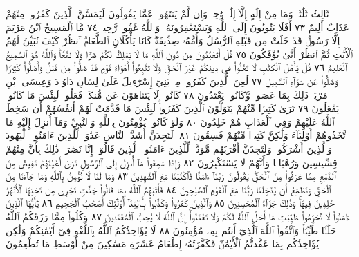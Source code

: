 ثَالِثُ ثَلَٰثَةࣲۘ وَمَا مِنْ إِلَٰهٍ إِلَّآ إِلَٰهࣱ وَٰحِدࣱۚ وَإِن لَّمْ يَنتَهُوا۟
عَمَّا يَقُولُونَ لَيَمَسَّنَّ ٱلَّذِينَ كَفَرُوا۟ مِنْهُمْ عَذَابٌ أَلِيمٌ ٧٣
أَفَلَا يَتُوبُونَ إِلَى ٱللَّهِ وَيَسْتَغْفِرُونَهُۥۚ وَٱللَّهُ غَفُورࣱ رَّحِيمࣱ ٧٤
مَّا ٱلْمَسِيحُ ٱبْنُ مَرْيَمَ إِلَّا رَسُولࣱ قَدْ خَلَتْ مِن قَبْلِهِ ٱلرُّسُلُ وَأُمُّهُۥ
صِدِّيقَةࣱۖ كَانَا يَأْكُلَانِ ٱلطَّعَامَۗ ٱنظُرْ كَيْفَ نُبَيِّنُ لَهُمُ ٱلْأٓيَٰتِ
ثُمَّ ٱنظُرْ أَنَّىٰ يُؤْفَكُونَ ٧٥ قُلْ أَتَعْبُدُونَ مِن دُونِ ٱللَّهِ مَا لَا
يَمْلِكُ لَكُمْ ضَرࣰّا وَلَا نَفْعࣰاۚ وَٱللَّهُ هُوَ ٱلسَّمِيعُ ٱلْعَلِيمُ ٧٦ قُلْ
يَٰٓأَهْلَ ٱلْكِتَٰبِ لَا تَغْلُوا۟ فِي دِينِكُمْ غَيْرَ ٱلْحَقِّ وَلَا تَتَّبِعُوٓا۟ أَهْوَآءَ
قَوْمࣲ قَدْ ضَلُّوا۟ مِن قَبْلُ وَأَضَلُّوا۟ كَثِيرࣰا وَضَلُّوا۟ عَن سَوَآءِ ٱلسَّبِيلِ ٧٧
لُعِنَ ٱلَّذِينَ كَفَرُوا۟ مِنۢ بَنِيٓ إِسْرَٰٓءِيلَ عَلَىٰ لِسَانِ
دَاوُۥدَ وَعِيسَى ٱبْنِ مَرْيَمَۚ ذَٰلِكَ بِمَا عَصَوا۟ وَّكَانُوا۟
يَعْتَدُونَ ٧٨ كَانُوا۟ لَا يَتَنَاهَوْنَ عَن مُّنكَرࣲ فَعَلُوهُۚ
لَبِئْسَ مَا كَانُوا۟ يَفْعَلُونَ ٧٩ تَرَىٰ كَثِيرࣰا مِّنْهُمْ
يَتَوَلَّوْنَ ٱلَّذِينَ كَفَرُوا۟ۚ لَبِئْسَ مَا قَدَّمَتْ لَهُمْ
أَنفُسُهُمْ أَن سَخِطَ ٱللَّهُ عَلَيْهِمْ وَفِي ٱلْعَذَابِ هُمْ
خَٰلِدُونَ ٨٠ وَلَوْ كَانُوا۟ يُؤْمِنُونَ بِٱللَّهِ وَٱلنَّبِيِّ وَمَآ
أُنزِلَ إِلَيْهِ مَا ٱتَّخَذُوهُمْ أَوْلِيَآءَ وَلَٰكِنَّ كَثِيرࣰا
مِّنْهُمْ فَٰسِقُونَ ٨١۞ لَتَجِدَنَّ أَشَدَّ ٱلنَّاسِ عَدَٰوَةࣰ
لِّلَّذِينَ ءَامَنُوا۟ ٱلْيَهُودَ وَٱلَّذِينَ أَشْرَكُوا۟ۖ وَلَتَجِدَنَّ
أَقْرَبَهُم مَّوَدَّةࣰ لِّلَّذِينَ ءَامَنُوا۟ ٱلَّذِينَ قَالُوٓا۟ إِنَّا نَصَٰرَىٰۚ
ذَٰلِكَ بِأَنَّ مِنْهُمْ قِسِّيسِينَ وَرُهْبَانࣰا وَأَنَّهُمْ
لَا يَسْتَكْبِرُونَ ٨٢ وَإِذَا سَمِعُوا۟ مَآ أُنزِلَ إِلَى
ٱلرَّسُولِ تَرَىٰٓ أَعْيُنَهُمْ تَفِيضُ مِنَ ٱلدَّمْعِ مِمَّا عَرَفُوا۟
مِنَ ٱلْحَقِّۖ يَقُولُونَ رَبَّنَآ ءَامَنَّا فَٱكْتُبْنَا مَعَ ٱلشَّٰهِدِينَ ٨٣
وَمَا لَنَا لَا نُؤْمِنُ بِٱللَّهِ وَمَا جَآءَنَا مِنَ ٱلْحَقِّ وَنَطْمَعُ أَن يُدْخِلَنَا
رَبُّنَا مَعَ ٱلْقَوْمِ ٱلصَّٰلِحِينَ ٨٤ فَأَثَٰبَهُمُ ٱللَّهُ بِمَا قَالُوا۟ جَنَّٰتࣲ
تَجْرِي مِن تَحْتِهَا ٱلْأَنْهَٰرُ خَٰلِدِينَ فِيهَاۚ وَذَٰلِكَ جَزَآءُ
ٱلْمُحْسِنِينَ ٨٥ وَٱلَّذِينَ كَفَرُوا۟ وَكَذَّبُوا۟ بِـَٔايَٰتِنَآ أُو۟لَٰٓئِكَ
أَصْحَٰبُ ٱلْجَحِيمِ ٨٦ يَٰٓأَيُّهَا ٱلَّذِينَ ءَامَنُوا۟ لَا تُحَرِّمُوا۟
طَيِّبَٰتِ مَآ أَحَلَّ ٱللَّهُ لَكُمْ وَلَا تَعْتَدُوٓا۟ۚ إِنَّ ٱللَّهَ لَا يُحِبُّ
ٱلْمُعْتَدِينَ ٨٧ وَكُلُوا۟ مِمَّا رَزَقَكُمُ ٱللَّهُ حَلَٰلࣰا طَيِّبࣰاۚ
وَٱتَّقُوا۟ ٱللَّهَ ٱلَّذِيٓ أَنتُم بِهِۦ مُؤْمِنُونَ ٨٨ لَا يُؤَاخِذُكُمُ ٱللَّهُ
بِٱللَّغْوِ فِيٓ أَيْمَٰنِكُمْ وَلَٰكِن يُؤَاخِذُكُم بِمَا عَقَّدتُّمُ ٱلْأَيْمَٰنَۖ
فَكَفَّٰرَتُهُۥٓ إِطْعَامُ عَشَرَةِ مَسَٰكِينَ مِنْ أَوْسَطِ مَا تُطْعِمُونَ
